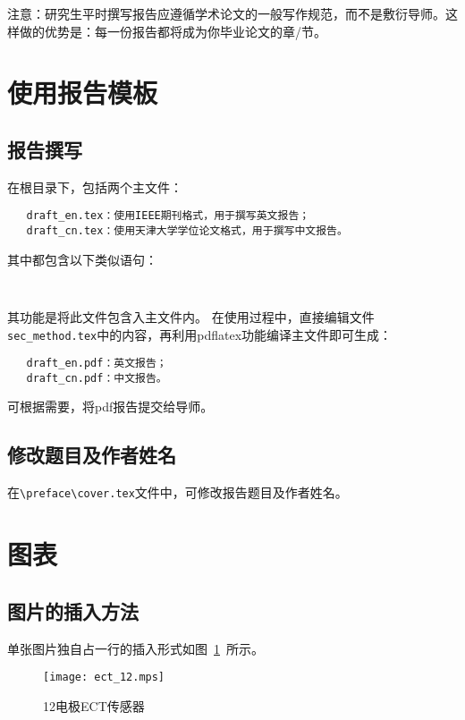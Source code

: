 
\textcolor[rgb]{0.00,0.07,1.00}{注意：研究生平时撰写报告应遵循学术论文的一般写作规范，而不是敷衍导师。这样做的优势是：每一份报告都将成为你毕业论文的章/节。
}
\section{使用报告模板}
\subsection{报告撰写}

在根目录下，包括两个主文件：
\begin{verbatim}
   draft_en.tex：使用IEEE期刊格式，用于撰写英文报告；
   draft_cn.tex：使用天津大学学位论文格式，用于撰写中文报告。
\end{verbatim}

其中都包含以下类似语句：

\begin{verbatim}
  
\end{verbatim}

其功能是将此文件包含入主文件内。
在使用过程中，直接编辑文件\verb+sec_method.tex+中的内容，再利用pdflatex功能编译主文件即可生成：
\begin{verbatim}
   draft_en.pdf：英文报告；
   draft_cn.pdf：中文报告。
\end{verbatim}

可根据需要，将pdf报告提交给导师。

\subsection{修改题目及作者姓名}

在\verb+\preface\cover.tex+文件中，可修改报告题目及作者姓名。


\section{图表}
\subsection{图片的插入方法}
单张图片独自占一行的插入形式如图~\ref{fig:dect_12}~所示。
\begin{figure}[htbp]
\centering
\texttt{[image: ect\_12.mps]}
\caption{12电极ECT传感器}\label{fig:dect_12}
\vspace{\baselineskip}
\end{figure}



